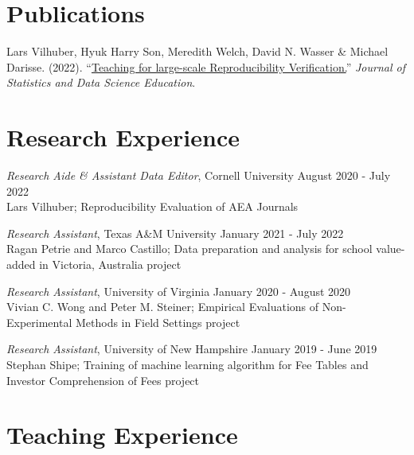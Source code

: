 \documentclass[letterpaper]{article}
\renewenvironment{itemize}{
  \begin{list}{}{
    \setlength{\leftmargin}{1.5em}
  }
}{
  \end{list}
}
\begin{document}
\section*{Publications}

\begin{itemize}
    \item Lars Vilhuber, Hyuk Harry Son, Meredith Welch, David N. Wasser \& Michael Darisse. (2022). ``\href{https://www.tandfonline.com/doi/full/10.1080/26939169.2022.2074582}{Teaching for large-scale Reproducibility Verification.}'' \textit{Journal of Statistics and Data Science Education}.
\end{itemize}

\section*{Research Experience}

\begin{itemize}
    \item \textit{Research Aide \& Assistant Data Editor}, Cornell University \hfill August 2020 - July 2022 \\
    Lars Vilhuber; Reproducibility Evaluation of AEA Journals 

    \item \textit{Research Assistant}, Texas A\&M University \hfill January 2021 - July 2022 \\
    Ragan Petrie and Marco Castillo;  Data preparation and analysis for school value-added in Victoria, Australia project

    \item \textit{Research Assistant}, University of Virginia \hfill January 2020 - August 2020 \\
    Vivian C. Wong and Peter M. Steiner; Empirical Evaluations of Non-Experimental Methods in Field Settings project

    \item \textit{Research Assistant}, University of New Hampshire \hfill January 2019 - June 2019 \\
    Stephan Shipe; Training of machine learning algorithm for Fee Tables and Investor Comprehension of Fees project

\end{itemize}

\section*{Teaching Experience}
\end{document}
